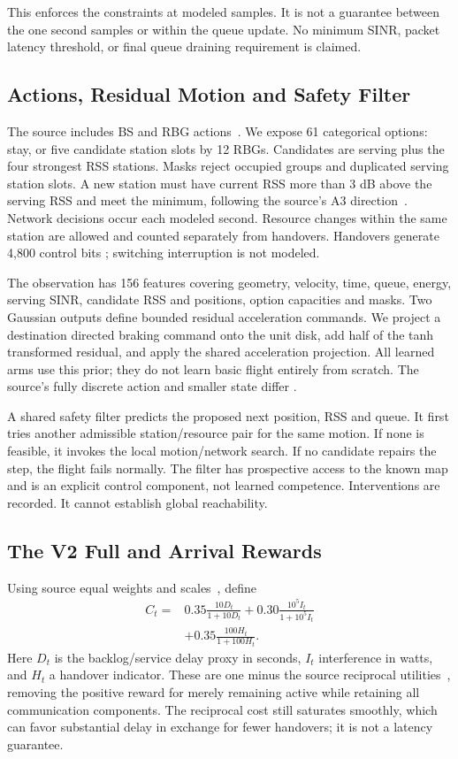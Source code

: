 \documentclass[conference]{IEEEtran}
\begin{document}
This enforces the constraints at modeled samples. It is not a guarantee
between the one second samples or within the queue update. No minimum SINR,
packet latency threshold, or final queue draining requirement is claimed.

\subsection{Actions, Residual Motion and Safety Filter}
The source includes BS and RBG actions~\cite[p.~12, Sec.~5.2]{thesis}. We expose
61 categorical options: stay, or five candidate station slots by 12 RBGs.
Candidates are serving plus the four strongest RSS stations. Masks reject
occupied groups and duplicated serving station slots. A new station must have
current RSS more than 3 dB above the serving RSS and meet the minimum, following
the source's A3 direction~\cite[p.~9, Eq.~(3); p.~15, Table~3]{thesis}.
Network decisions occur each modeled second. Resource changes within the same station are allowed and
counted separately from handovers. Handovers generate 4,800 control bits
\cite[p.~15, Table~3]{thesis}; switching interruption is not modeled.

The observation has 156 features covering geometry, velocity, time, queue,
energy, serving SINR, candidate RSS and positions, option capacities and masks.
Two Gaussian outputs define bounded residual acceleration commands. We project
a destination directed braking command onto the unit disk, add half of the
tanh transformed residual, and apply the shared acceleration projection. All
learned arms use this prior; they do not learn basic flight entirely from
scratch. The source's fully discrete action and smaller state differ
\cite[p.~12, Sec.~5.2]{thesis}.

A shared safety filter predicts the proposed next position, RSS and queue. It
first tries another admissible station/resource pair for the same motion. If
none is feasible, it invokes the local motion/network search. If no candidate
repairs the step, the flight fails normally. The filter has prospective access
to the known map and is an explicit control component, not learned competence.
Interventions are recorded. It cannot establish global reachability.

\subsection{The V2 Full and Arrival Rewards}
Using source equal weights and scales~\cite[p.~15, Table~3]{thesis}, define
\begin{align}
C_t={}&0.35\frac{10D_t}{1+10D_t}
 +0.30\frac{10^5I_t}{1+10^5I_t}\nonumber\\
 &+0.35\frac{100H_t}{1+100H_t}.
\end{align}
Here $D_t$ is the backlog/service delay proxy in seconds, $I_t$ interference in
watts, and $H_t$ a handover indicator. These are one minus the source reciprocal
utilities~\cite[p.~12, Eq.~(13)]{thesis}, removing the positive reward for merely
remaining active while retaining all communication components. The reciprocal
cost still saturates smoothly, which can favor substantial delay in exchange
for fewer handovers; it is not a latency guarantee.
\end{document}
